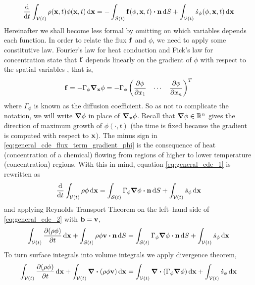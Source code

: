 \begin{equation} \label{eq:general_cde_1}
	\frac{\dd}{\dd{t}} \int_{\cvt} \rho(\vb{x}, t) \phi(\vb{x}, t) \dd{\vb{x}} = 
	- \int_{\cst} \vb{f}(\phi, \vb{x}, t) \vdot \vb{n} \dd{S} 
	+ \int_{\cvt} \dot{s}_\phi (\phi, \vb{x}, t) \dd{\vb{x}}	
\end{equation}
Hereinafter we shall become less formal by omitting on which variables depends each function. In order to relate the flux $\vb{f}$ and $\phi$, we need to apply some constitutive law. Fourier's law for heat conduction and Fick's law for concentration state that $\vb{f}$ depends linearly on the gradient of $\phi$ with respect to the spatial variables \cite{evans1998heat}, that is,
\begin{equation} \label{eq:general_cde_flux_term_gradient_phi}
	\vb{f} = 
	-\Gamma_\phi \grad_{\vb{x}} \phi = 
	-\Gamma_\phi
	\begin{pmatrix}
		\displaystyle\pdv{\phi}{x_1} & \cdots & \displaystyle\pdv{\phi}{x_n}
	\end{pmatrix}^T
\end{equation}
where $\Gamma_\phi$ is known as the diffusion coefficient. So as not to complicate the notation, we will write $\grad{\phi}$ in place of $\grad_{\vb{x}} \phi$. Recall that $\grad{\phi} \in \mathbb{R}^n$ gives the direction of maximum growth of $\phi(\cdot, t)$ (the time is fixed because the gradient is computed with respect to $\vb{x}$). The minus sign in \eqref{eq:general_cde_flux_term_gradient_phi} is the consequence of heat (concentration of a chemical) flowing from regions of higher to lower temperature (concentration) regions. With this in mind, equation \eqref{eq:general_cde_1} is rewritten as
\begin{equation} \label{eq:general_cde_2}
	\frac{\dd}{\dd{t}} \int_{\cvt} \rho \phi \dd{\vb{x}} = 
	\int_{\cst} \Gamma_\phi \grad{\phi} \vdot \vb{n} \dd{S} +
	\int_{\cvt} \dot{s}_\phi \dd{\vb{x}}	
\end{equation}
and applying Reynolds Transport Theorem on the left--hand side of \eqref{eq:general_cde_2} with $\vb{b} = \vb{v}$,
\begin{equation}
	\int_{\cvt} \pdv{(\rho \phi)}{t} \dd{\vb{x}} + 
	\int_{\cst} \rho \phi \vb{v} \vdot \vb{n} \dd{S} = 
	\int_{\cst} \Gamma_\phi \grad{\phi} \vdot \vb{n} \dd{S} +
	\int_{\cvt} \dot{s}_\phi \dd{\vb{x}}	
\end{equation}
To turn surface integrals into volume integrals we apply divergence theorem,
\begin{equation}
	\int_{{\mathcal{V}(t)}} \pdv{(\rho \phi)}{t} \dd{\vb{x}} + 
	\int_{{\mathcal{V}(t)}} \div(\rho \phi \vb{v}) \dd{\vb{x}} = 
	\int_{{\mathcal{V}(t)}} \div(\Gamma_\phi \grad{\phi}) \dd{\vb{x}} + 
	\int_{{\mathcal{V}(t)}} \dot{s}_\phi \dd{\vb{x}}	
\end{equation}
